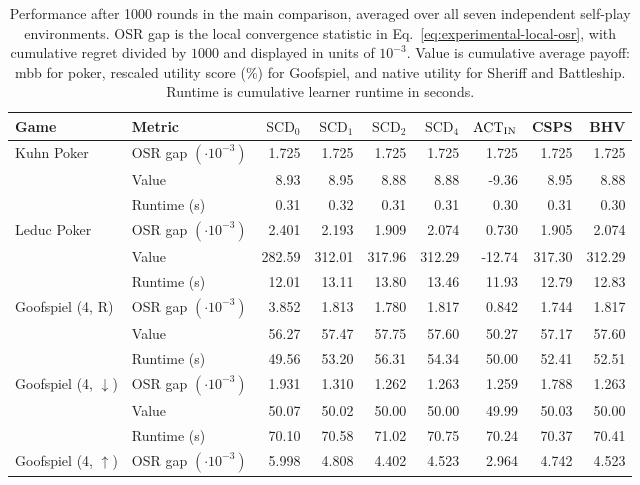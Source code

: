 \begin{table}[t]
\centering
\caption{Performance after 1000 rounds in the main comparison, averaged over all seven independent self-play environments. OSR gap is the local convergence statistic in Eq.~\eqref{eq:experimental-local-osr}, with cumulative regret divided by \(1000\) and displayed in units of \(10^{-3}\). Value is cumulative average payoff: mbb for poker, rescaled utility score (\%) for Goofspiel, and native utility for Sheriff and Battleship. Runtime is cumulative learner runtime in seconds.}
\label{tab:main-endpoints}
\fontsize{8.5}{11}\selectfont
\renewcommand{\arraystretch}{1.08}
\setlength{\tabcolsep}{3pt}
\begin{tabular*}{\textwidth}{@{\extracolsep{\fill}}llrrrrrrr@{}}
\hline
Game & Metric & \(\mathrm{SCD}_0\) & \(\mathrm{SCD}_1\) & \(\mathrm{SCD}_2\) & \(\mathrm{SCD}_4\) & \(\mathrm{ACT}_{\rm IN}\) & CSPS & BHV\\
\hline
Kuhn Poker & OSR gap \((\cdot10^{-3})\) & 1.725 & 1.725 & 1.725 & 1.725 & 1.725 & 1.725 & 1.725\\
 & Value & 8.93 & 8.95 & 8.88 & 8.88 & -9.36 & 8.95 & 8.88\\
 & Runtime (s) & 0.31 & 0.32 & 0.31 & 0.31 & 0.30 & 0.31 & 0.30\\
\hline
Leduc Poker & OSR gap \((\cdot10^{-3})\) & 2.401 & 2.193 & 1.909 & 2.074 & 0.730 & 1.905 & 2.074\\
 & Value & 282.59 & 312.01 & 317.96 & 312.29 & -12.74 & 317.30 & 312.29\\
 & Runtime (s) & 12.01 & 13.11 & 13.80 & 13.46 & 11.93 & 12.79 & 12.83\\
\hline
Goofspiel (4, R) & OSR gap \((\cdot10^{-3})\) & 3.852 & 1.813 & 1.780 & 1.817 & 0.842 & 1.744 & 1.817\\
 & Value & 56.27 & 57.47 & 57.75 & 57.60 & 50.27 & 57.17 & 57.60\\
 & Runtime (s) & 49.56 & 53.20 & 56.31 & 54.34 & 50.00 & 52.41 & 52.51\\
\hline
Goofspiel (4, $\downarrow$) & OSR gap \((\cdot10^{-3})\) & 1.931 & 1.310 & 1.262 & 1.263 & 1.259 & 1.788 & 1.263\\
 & Value & 50.07 & 50.02 & 50.00 & 50.00 & 49.99 & 50.03 & 50.00\\
 & Runtime (s) & 70.10 & 70.58 & 71.02 & 70.75 & 70.24 & 70.37 & 70.41\\
\hline
Goofspiel (4, $\uparrow$) & OSR gap \((\cdot10^{-3})\) & 5.998 & 4.808 & 4.402 & 4.523 & 2.964 & 4.742 & 4.523\\

\end{tabular*}
\end{table}
